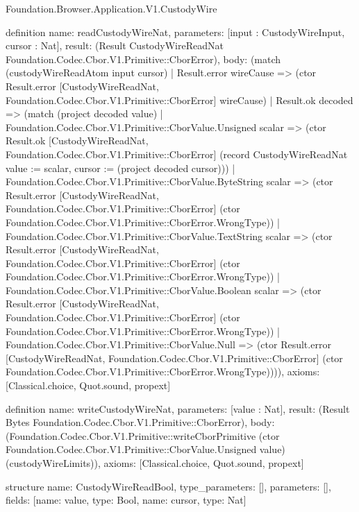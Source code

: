 \begin{lexlean}{Foundation.Browser.Application.V1.CustodyWire}
\begin{semanticmodule}
definition{
  name: readCustodyWireNat,
  parameters: [input : CustodyWireInput, cursor : Nat],
  result: (Result CustodyWireReadNat Foundation.Codec.Cbor.V1.Primitive::CborError),
  body: (match (custodyWireReadAtom input cursor)
    | Result.error wireCause => (ctor Result.error [CustodyWireReadNat, Foundation.Codec.Cbor.V1.Primitive::CborError] wireCause)
    | Result.ok decoded => (match (project decoded value)
      | Foundation.Codec.Cbor.V1.Primitive::CborValue.Unsigned scalar => (ctor Result.ok [CustodyWireReadNat, Foundation.Codec.Cbor.V1.Primitive::CborError] (record CustodyWireReadNat {value := scalar, cursor := (project decoded cursor)}))
      | Foundation.Codec.Cbor.V1.Primitive::CborValue.ByteString scalar => (ctor Result.error [CustodyWireReadNat, Foundation.Codec.Cbor.V1.Primitive::CborError] (ctor Foundation.Codec.Cbor.V1.Primitive::CborError.WrongType))
      | Foundation.Codec.Cbor.V1.Primitive::CborValue.TextString scalar => (ctor Result.error [CustodyWireReadNat, Foundation.Codec.Cbor.V1.Primitive::CborError] (ctor Foundation.Codec.Cbor.V1.Primitive::CborError.WrongType))
      | Foundation.Codec.Cbor.V1.Primitive::CborValue.Boolean scalar => (ctor Result.error [CustodyWireReadNat, Foundation.Codec.Cbor.V1.Primitive::CborError] (ctor Foundation.Codec.Cbor.V1.Primitive::CborError.WrongType))
      | Foundation.Codec.Cbor.V1.Primitive::CborValue.Null => (ctor Result.error [CustodyWireReadNat, Foundation.Codec.Cbor.V1.Primitive::CborError] (ctor Foundation.Codec.Cbor.V1.Primitive::CborError.WrongType)))),
  axioms: [Classical.choice, Quot.sound, propext]
}

definition{
  name: writeCustodyWireNat,
  parameters: [value : Nat],
  result: (Result Bytes Foundation.Codec.Cbor.V1.Primitive::CborError),
  body: (Foundation.Codec.Cbor.V1.Primitive::writeCborPrimitive (ctor Foundation.Codec.Cbor.V1.Primitive::CborValue.Unsigned value) (custodyWireLimits)),
  axioms: [Classical.choice, Quot.sound, propext]
}

structure{
  name: CustodyWireReadBool,
  type_parameters: [],
  parameters: [],
  fields: [{name: value, type: Bool}, {name: cursor, type: Nat}]
}


\end{semanticmodule}
\end{lexlean}
